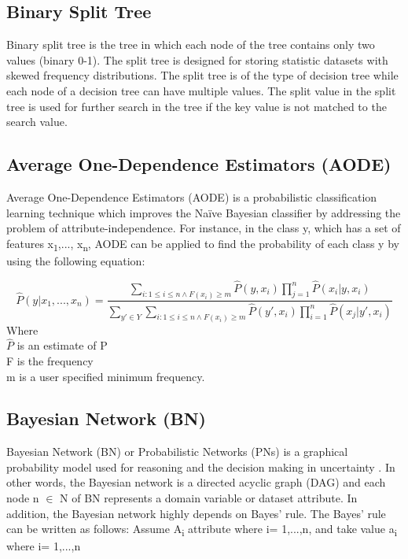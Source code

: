 \documentclass[review]{elsarticle}
\begin{document}
\subsection{Binary Split Tree}
\label{subsec:BST}
Binary split tree is the tree in which each node of the tree contains only two values (binary 0-1). The split tree is designed for storing statistic datasets with skewed frequency distributions. The split tree is of the type of decision tree while each node of a decision tree can have multiple values. The split value in the split tree is used for further search in the tree if the key value is not matched to the search value.

\subsection{Average One-Dependence Estimators (AODE)}
\label{subsec:AODE}
Average One-Dependence Estimators (AODE) is a probabilistic classification learning technique which improves the Na\"ive Bayesian classifier \cite{Webb2005} by addressing the problem of attribute-independence. For instance, in the class y, which has a set of features x\textsubscript{1},..., x\textsubscript{n}, AODE can be applied to find the probability of each class y by using the following equation:
	
 	\begin{equation}
 	\hat{P}(y|x_1,...,x_n) = \dfrac{\sum_{i:1\leq i\leq n \wedge F(x_i) \geq m} \hat{P}(y,x_i)\prod_{j=1}^n \hat{P}(x_i|y,x_i)}{ \sum_{y'\in Y}  \sum_{i:1\leq i\leq n \wedge F(x_i) \geq m} \hat{P}(y',x_i) \prod_{i=1}^n \hat{P}(x_j|y',x_i) }
 	\label{AODE}
 	\end{equation}
 	Where \\
 	$\hat{P}$ is an estimate of P \\
 	F  is the frequency \\
 	m is a user specified minimum frequency.

\subsection{Bayesian Network (BN)}
\label{subsec:BN}
Bayesian Network (BN) or Probabilistic Networks (PNs) is a graphical probability model used for reasoning and the decision making in uncertainty \cite{Friedman1998}. In other words, the Bayesian network is a directed acyclic graph (DAG) and each node n $\in$ N of BN represents a domain variable or dataset attribute. In addition, the Bayesian network highly depends on Bayes’ rule. The Bayes' rule can be written as follows: 
 	Assume A\textsubscript{i}  attribute where i= 1,...,n, and take value a\textsubscript{i}  where i= 1,...,n
 	
\end{document}
